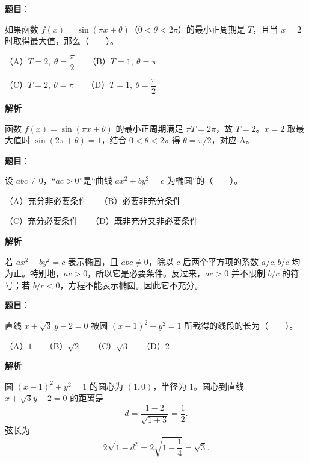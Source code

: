\begin{answer}

\textbf{题目}：

如果函数 $f(x)=\sin(\pi x+\theta)$（$0<\theta<2\pi$）的最小正周期是 $T$，且当 $x=2$ 时取得最大值，那么\mbox{（　　）}。

（A）$T=2,\ \theta=\dfrac{\pi}{2}$　　（B）$T=1,\ \theta=\pi$

（C）$T=2,\ \theta=\pi$　　（D）$T=1,\ \theta=\dfrac{\pi}{2}$

\textbf{解析}

函数 $f(x)=\sin(\pi x+\theta)$ 的最小正周期满足 $\pi T=2\pi$，故 $T=2$。$x=2$ 取最大值时 $\sin(2\pi+\theta)=1$，结合 $0<\theta<2\pi$ 得 $\theta=\pi/2$，对应 A。


\end{answer}
\begin{answer}

\textbf{题目}：

设 $abc\ne0$，“$ac>0$”是“曲线 $ax^2+by^2=c$ 为椭圆”的\mbox{（　　）}。

（A）充分非必要条件　　（B）必要非充分条件

（C）充分必要条件　　（D）既非充分又非必要条件

\textbf{解析}

若 $ax^2+by^2=c$ 表示椭圆，且 $abc\ne0$，除以 $c$ 后两个平方项的系数 $a/c,b/c$ 均为正。特别地，$ac>0$，所以它是必要条件。反过来，$ac>0$ 并不限制 $b/c$ 的符号；若 $b/c<0$，方程不能表示椭圆。因此它不充分。


\end{answer}
\begin{answer}

\textbf{题目}：

直线 $x+\sqrt{3}\,y-2=0$ 被圆 $(x-1)^2+y^2=1$ 所截得的线段的长为\mbox{（　　）}。

（A）$1$　　（B）$\sqrt{2}$　　（C）$\sqrt{3}$　　（D）$2$

\textbf{解析}

圆 $(x-1)^2+y^2=1$ 的圆心为 $(1,0)$，半径为 $1$。圆心到直线 $x+\sqrt3y-2=0$ 的距离是
\nopagebreak[4]
\[
d=\frac{|1-2|}{\sqrt{1+3}}=\frac12.
\]
弦长为
\nopagebreak[4]
\[
2\sqrt{1-d^2}=2\sqrt{1-\frac14}=\sqrt3.
\]


\end{answer}
